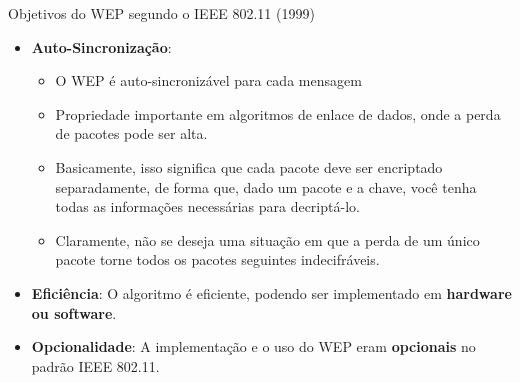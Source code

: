 \begin{frame}{Objetivos do WEP segundo o IEEE 802.11 (1999)}

\begin{itemize}
\item \textbf{Auto-Sincronização}:
\begin{itemize}
    \item O WEP é auto-sincronizável para cada mensagem
        \item Propriedade importante em algoritmos de enlace de dados, onde a perda de pacotes pode ser alta.

    \item Basicamente, isso significa que cada pacote deve ser encriptado separadamente, de forma que, dado um pacote e a chave, você tenha todas as informações necessárias para decriptá-lo.
    \item Claramente, não se deseja uma situação em que a perda de um único pacote torne todos os pacotes seguintes indecifráveis.
\end{itemize}
\end{itemize}

\begin{itemize}
\item \textbf{Eficiência}:
O algoritmo é eficiente, podendo ser implementado em \textbf{hardware ou software}.
\end{itemize}

\begin{itemize}
\item \textbf{Opcionalidade}:
A implementação e o uso do WEP eram \textbf{opcionais} no padrão IEEE 802.11.
\end{itemize}
\end{frame}

